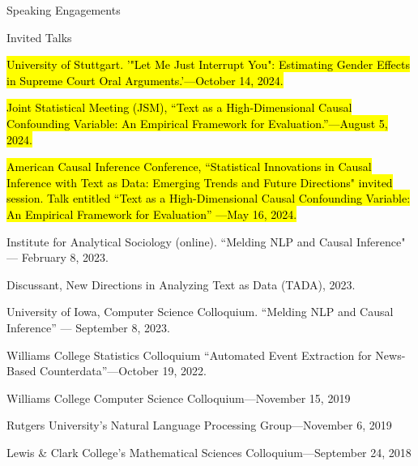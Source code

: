 \documentclass{resume} %
\begin{document}
\begin{rSection}{Speaking Engagements}

\begin{rSubsection}{Invited Talks}{}{}{}
\item \hl{University of Stuttgart. '"Let Me Just Interrupt You":
Estimating Gender Effects in Supreme
Court Oral Arguments.'---October 14, 2024.}
\item \hl{Joint Statistical Meeting (JSM), ``Text as a High-Dimensional Causal Confounding Variable: 
An Empirical Framework for Evaluation.''---August 5, 2024.}
\item \hl{American Causal Inference Conference, ``Statistical Innovations in Causal Inference with Text as Data: Emerging Trends and Future Directions" invited session. Talk entitled ``Text as a High-Dimensional Causal Confounding Variable: An Empirical Framework for Evaluation'' ---May 16, 2024.}
\item Institute for Analytical Sociology (online). ``Melding NLP and Causal Inference" --- February 8, 2023. 
\item Discussant, New Directions in Analyzing Text as Data (TADA), 2023.
\item University of Iowa, Computer Science Colloquium. ``Melding NLP and Causal Inference'' --- September 8, 2023. 
\item Williams College Statistics Colloquium ``Automated Event Extraction for
News-Based Counterdata''---October 19, 2022.
\item Williams College Computer Science Colloquium---November 15, 2019
\item Rutgers University's Natural Language Processing Group---November 6, 2019
\item Lewis \& Clark College's Mathematical Sciences Colloquium---September 24, 2018
\end{rSubsection}


\end{rSection}
\end{document}
